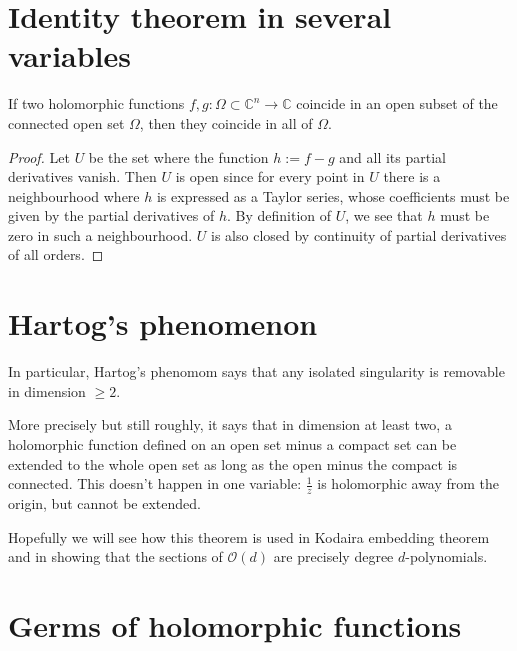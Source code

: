 \section{Identity theorem in several
variables}
\label{section-ident-theor-sever-varia}

\begin{theorem}
\label{theorem-identity-several-variables}
\begin{reference}
\cite[Proposition 1.28]{lec}
\end{reference}
If two holomorphic functions
$f,g:\Omega\subset \mathbb{C}^n \to
\mathbb{C}$ coincide
in an open subset of the connected open set
$\Omega$,
then they coincide in all of $\Omega$.
\end{theorem}

\begin{proof}
Let $U$ be the set where the function
$h:=f-g$ and all its partial derivatives
vanish. Then $U$ is open since for every
point in $U$ there is a neighbourhood
where $h$ is expressed as a Taylor series,
whose coefficients must be given by
the partial derivatives of $h$. By definition
of $U$, we see that $h$ must be
zero in such a neighbourhood. $U$ is also
closed by continuity of partial
derivatives of all orders.
\end{proof}

\section{Hartog's phenomenon}
\label{section-hartog}

\noindent
In particular, Hartog's phenomom says
that any isolated singularity is removable in
dimension $\geq 2$.

More precisely but still roughly,
it says that in dimension at least two,
a holomorphic function defined on an open set
minus a compact set
can be extended to the whole open set
as long as the open minus the compact is
connected.
This doesn't happen in one variable:
$\frac{1}{z}$
is holomorphic away from the origin, but
cannot be extended.

Hopefully we will see how this theorem is
used
in Kodaira embedding theorem and in showing
that
the sections of $\mathcal{O}(d)$ are
precisely degree $d$-polynomials.


\begin{theorem}
\label{theorem-hartog}
\end{theorem}

\section{Germs of holomorphic functions}
\label{section-germs-holom-funct}

